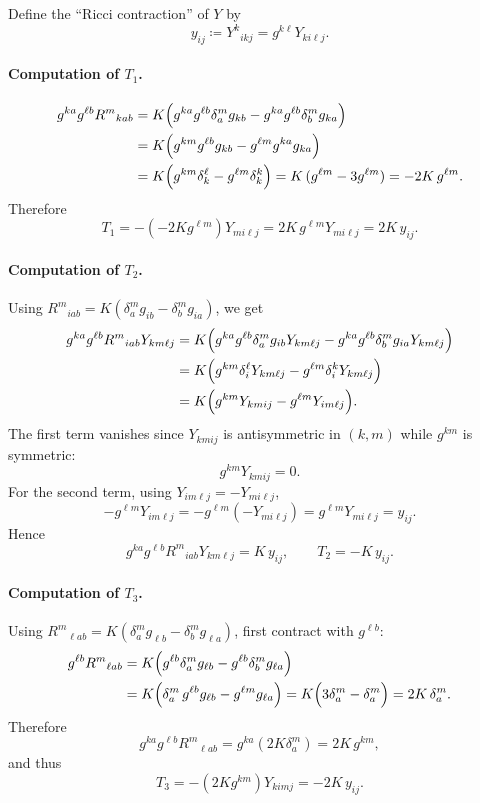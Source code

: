 \documentclass[a4paper,12pt]{article}
\begin{document}
Define the ``Ricci contraction'' of \(Y\) by
\[
y_{ij} \coloneqq Y^{k}{}_{i k j} = g^{k\ell} Y_{k i \ell j}.
\]

\paragraph{Computation of \(T_1\).}
\[
\begin{aligned}
g^{ka} g^{\ell b} R^{m}{}_{k a b}
&= K\Bigl(g^{ka} g^{\ell b}\delta^{m}_{a} g_{k b} - g^{ka} g^{\ell b}\delta^{m}_{b} g_{k a}\Bigr) \\
&= K\Bigl(g^{km} g^{\ell b} g_{k b} - g^{\ell m} g^{ka} g_{k a}\Bigr) \\
&= K\Bigl(g^{km}\delta^{\ell}_{k} - g^{\ell m}\delta^{k}_{k}\Bigr)
= K\,(g^{\ell m} - 3 g^{\ell m})
= -2K\, g^{\ell m}.
\end{aligned}
\]
Therefore
\[
T_1
= -(-2K g^{\ell m}) Y_{m i \ell j}
= 2K\, g^{\ell m} Y_{m i \ell j}
= 2K\, y_{ij}.
\]

\paragraph{Computation of \(T_2\).}
Using \(R^{m}{}_{i a b} = K(\delta^{m}_{a} g_{i b} - \delta^{m}_{b} g_{i a})\), we get
\[
\begin{aligned}
g^{ka} g^{\ell b} R^{m}{}_{i a b} Y_{k m \ell j}
&= K\Bigl(g^{ka} g^{\ell b}\delta^{m}_{a} g_{i b} Y_{k m \ell j}
        - g^{ka} g^{\ell b}\delta^{m}_{b} g_{i a} Y_{k m \ell j}\Bigr) \\
&= K\Bigl(g^{km} \delta^{\ell}_{i} Y_{k m \ell j}
        - g^{\ell m} \delta^{k}_{i} Y_{k m \ell j}\Bigr) \\
&= K\Bigl(g^{km} Y_{k m i j} - g^{\ell m} Y_{i m \ell j}\Bigr).
\end{aligned}
\]
The first term vanishes since \(Y_{k m i j}\) is antisymmetric in \((k,m)\) while \(g^{km}\) is symmetric:
\[
g^{km} Y_{k m i j} = 0.
\]
For the second term, using \(Y_{i m \ell j} = -Y_{m i \ell j}\),
\[
- g^{\ell m} Y_{i m \ell j}
= - g^{\ell m}(-Y_{m i \ell j})
= g^{\ell m} Y_{m i \ell j}
= y_{ij}.
\]
Hence
\[
g^{ka} g^{\ell b} R^{m}{}_{i a b} Y_{k m \ell j} = K\, y_{ij},
\qquad
T_2 = -K\, y_{ij}.
\]

\paragraph{Computation of \(T_3\).}
Using \(R^{m}{}_{\ell a b} = K(\delta^{m}_{a} g_{\ell b} - \delta^{m}_{b} g_{\ell a})\), first contract with \(g^{\ell b}\):
\[
\begin{aligned}
g^{\ell b} R^{m}{}_{\ell a b}
&= K\Bigl(g^{\ell b}\delta^{m}_{a} g_{\ell b} - g^{\ell b}\delta^{m}_{b} g_{\ell a}\Bigr) \\
&= K\Bigl(\delta^{m}_{a}\, g^{\ell b} g_{\ell b} - g^{\ell m} g_{\ell a}\Bigr)
= K\Bigl(3\delta^{m}_{a} - \delta^{m}_{a}\Bigr)
= 2K\,\delta^{m}_{a}.
\end{aligned}
\]
Therefore
\[
g^{ka} g^{\ell b} R^{m}{}_{\ell a b}
= g^{ka}(2K\delta^{m}_{a})
= 2K\, g^{k m},
\]
and thus
\[
T_3
= -(2K g^{k m}) Y_{k i m j}
= -2K\, y_{ij}.
\]
\end{document}
